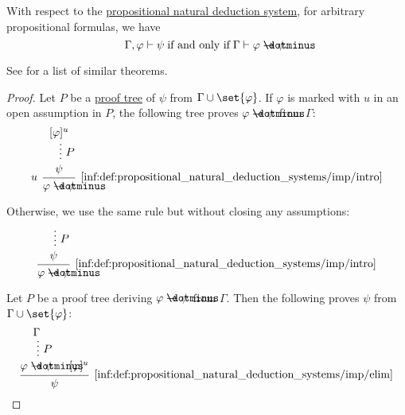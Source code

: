 \begin{theorem}\label{thm:propositional_syntactic_deduction_theorem}
  With respect to the \hyperref[def:abstract_propositional_natural_deduction_system]{propositional natural deduction system}, for arbitrary propositional formulas, we have
  \begin{equation*}
    \Gamma, \varphi \vdash \psi \T{if and only if} \Gamma \vdash \varphi \synimplies \psi.
  \end{equation*}
\end{theorem}
\begin{comments}
  \item See  for a list of similar theorems.
\end{comments}
\begin{proof}
  \SufficiencySubProof Let \( P \) be a \hyperref[def:natural_deduction_proof_tree]{proof tree} of \( \psi \) from \( \Gamma \cup \set{ \varphi } \). If \( \varphi \) is marked with \( u \) in an open assumption in \( P \), the following tree proves \( \varphi \synimplies \psi \) from \( \Gamma \):
  \begin{equation*}
    \begin{prooftree}
      \hypo{ [\varphi]^u }
      \ellipsis { \( P \) } { \psi }
      \infer[left label=\( u \)]1[\ref{inf:def:propositional_natural_deduction_systems/imp/intro}]{ \varphi \synimplies \psi }
    \end{prooftree}
  \end{equation*}

  Otherwise, we use the same rule but without closing any assumptions:
  \begin{equation*}
    \begin{prooftree}
      \hypo{}
      \ellipsis { \( P \) } { \psi }
      \infer1[\ref{inf:def:propositional_natural_deduction_systems/imp/intro}]{ \varphi \synimplies \psi }
    \end{prooftree}
  \end{equation*}

  \NecessitySubProof Let \( P \) be a proof tree deriving \( \varphi \synimplies \psi \) from \( \Gamma \). Then the following proves \( \psi \) from \( \Gamma \cup \set{ \varphi } \):
  \begin{equation*}
    \begin{prooftree}
      \hypo {\Gamma}
      \ellipsis { \( P \) } { \varphi \synimplies \psi }

      \hypo { [\varphi]^u }
      \infer2[\ref{inf:def:propositional_natural_deduction_systems/imp/elim}]{ \psi }
    \end{prooftree}
  \end{equation*}
\end{proof}

